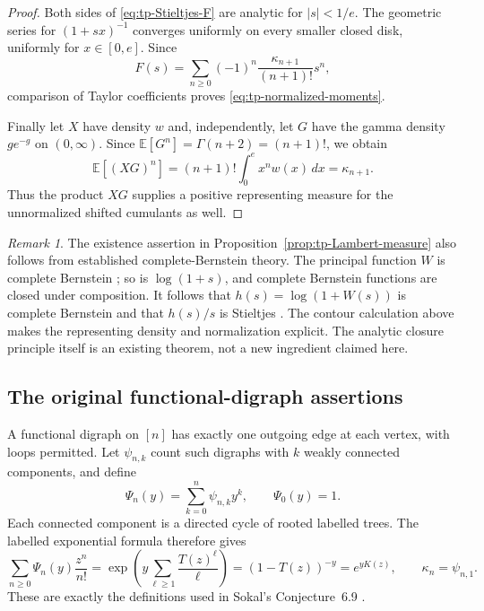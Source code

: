\documentclass[11pt,a4paper]{article}
\theoremstyle{definition}
\theoremstyle{remark}
\newtheorem{remark}[theorem]{Remark}
\newcommand{\E}{\mathbb E}
\numberwithin{equation}{section}
\begin{document}
\begin{proof}
Both sides of \eqref{eq:tp-Stieltjes-F} are analytic for $|s|<1/e$.
The geometric series for $(1+sx)^{-1}$ converges uniformly on every
smaller closed disk, uniformly for $x\in[0,e]$.  Since
\[
 F(s)=\sum_{n\geq0}(-1)^n\frac{\kappa_{n+1}}{(n+1)!}s^n,
\]
comparison of Taylor coefficients proves
\eqref{eq:tp-normalized-moments}.

Finally let $X$ have density $w$ and, independently, let $G$ have the
gamma density $g e^{-g}$ on $(0,\infty)$.  Since
$\E[G^n]=\Gamma(n+2)=(n+1)!$, we obtain
\[
 \E[(XG)^n]=(n+1)!\int_0^e x^n w(x)\,dx=\kappa_{n+1}.
\]
Thus the product $XG$ supplies a positive representing measure for the
unnormalized shifted cumulants as well.
\end{proof}

\begin{remark}
The existence assertion in Proposition~\ref{prop:tp-Lambert-measure}
also follows from established complete-Bernstein theory.  The principal
function $W$ is complete Bernstein \cite{Lambert2012}; so is
$\log(1+s)$, and complete Bernstein functions are closed under composition.
It follows that $h(s)=\log(1+W(s))$ is complete Bernstein and that $h(s)/s$
is Stieltjes \cite{Schilling2012}.  The contour calculation above makes
the representing density and normalization explicit.  The analytic
closure principle itself is an existing theorem, not a new ingredient
claimed here.
\end{remark}

\subsection{The original functional-digraph assertions}

A functional digraph on $[n]$ has exactly one outgoing edge at each
vertex, with loops permitted.  Let $\psi_{n,k}$ count such digraphs with
$k$ weakly connected components, and define
\[
 \Psi_n(y)=\sum_{k=0}^n\psi_{n,k}y^k,
 \qquad \Psi_0(y)=1.
\]
Each connected component is a directed cycle of rooted labelled trees.
The labelled exponential formula therefore gives
\begin{equation}
 \sum_{n\geq0}\Psi_n(y)\frac{z^n}{n!}
  =\exp\!\left(y\sum_{\ell\geq1}\frac{T(z)^\ell}{\ell}\right)
  =(1-T(z))^{-y}=e^{yK(z)},
 \qquad \kappa_n=\psi_{n,1}.
 \label{eq:tp-functional-EGF}
\end{equation}
These are exactly the definitions used in Sokal's Conjecture~6.9
\cite{Sokal2022}.
\end{document}
